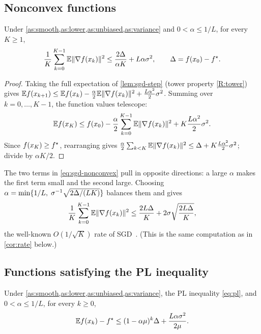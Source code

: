 \subsection{Nonconvex functions}

\begin{theorem}\label{thm:sgd-nonconvex}
Under \cref{as:smooth,as:lower,as:unbiased,as:variance} and $0<\alpha\le1/L$, for every
$K\ge1$,
\begin{equation}\label{eq:sgd-nonconvex}
  \frac1K\sum_{k=0}^{K-1}\mathbb{E}\lVert \nabla f(x_k)\rVert^2\le\frac{2\Delta}{\alpha K}+L\alpha\sigma^2,
  \qquad\Delta=f(x_0)-f^\star .
\end{equation}
\end{theorem}

\begin{proof}
Taking the full expectation of \cref{lem:sgd-step} (tower property \ref{R:tower}) gives
$\mathbb{E} f(x_{k+1})\le\mathbb{E} f(x_k)-\frac\alpha2\mathbb{E}\lVert \nabla f(x_k)\rVert^2+\frac{L\alpha^2}{2}\sigma^2$.
Summing over $k=0,\dots,K-1$, the function values telescope:
\[
  \mathbb{E} f(x_K)\le f(x_0)-\frac\alpha2\sum_{k=0}^{K-1}\mathbb{E}\lVert \nabla f(x_k)\rVert^2+K\frac{L\alpha^2}{2}\sigma^2 .
\]
Since $f(x_K)\ge f^\star$, rearranging gives
$\frac\alpha2\sum_{k<K}\mathbb{E}\lVert \nabla f(x_k)\rVert^2\le\Delta+K\frac{L\alpha^2}{2}\sigma^2$; divide by
$\alpha K/2$.
\end{proof}

The two terms in \eqref{eq:sgd-nonconvex} pull in opposite directions: a large $\alpha$
makes the first term small and the second large. Choosing
$\alpha=\min\{1/L,\;\sigma^{-1}\sqrt{2\Delta/(LK)}\}$ balances them and gives
\begin{equation}\label{eq:sgd-rate}
  \frac1K\sum_{k=0}^{K-1}\mathbb{E}\lVert \nabla f(x_k)\rVert^2\le\frac{2L\Delta}{K}+2\sigma\sqrt{\frac{2L\Delta}{K}},
\end{equation}
the well-known $O(1/\sqrt K)$ rate of SGD~\cite{ghadimilan2013}. (This is the same
computation as in \cref{cor:rate} below.)

\subsection{Functions satisfying the PL inequality}

\begin{theorem}[SGD, PL]\label{thm:sgd-pl}
Under \cref{as:smooth,as:lower,as:unbiased,as:variance}, the PL inequality \eqref{eq:pl},
and $0<\alpha\le1/L$, for every $k\ge0$,
\[
  \mathbb{E} f(x_k)-f^\star\le(1-\alpha\mu)^k\Delta+\frac{L\alpha\sigma^2}{2\mu}.
\]
\end{theorem}

